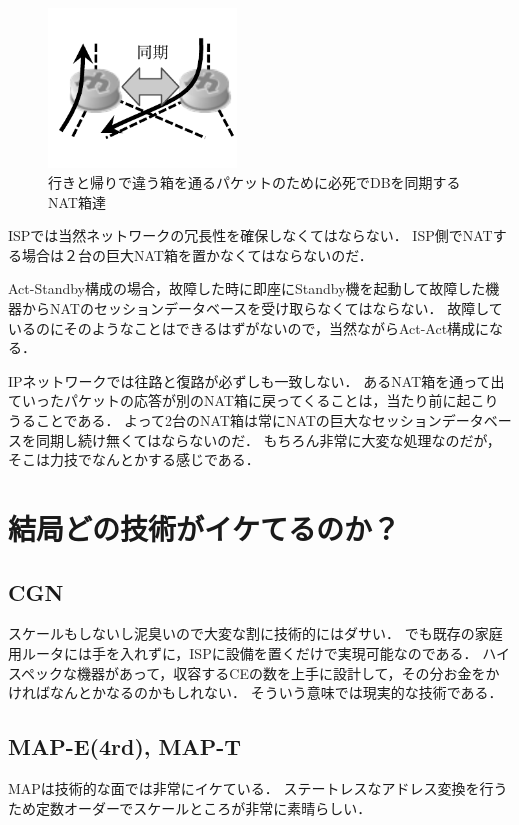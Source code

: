 \begin{figure}
\centering
\includegraphics[bb=0 10 140 109,width=5cm]{./yuyarin/cgn-nat.pdf}
\caption{行きと帰りで違う箱を通るパケットのために必死でDBを同期するNAT箱達}
\end{figure}

ISPでは当然ネットワークの冗長性を確保しなくてはならない．
ISP側でNATする場合は２台の巨大NAT箱を置かなくてはならないのだ．

Act-Standby構成の場合，故障した時に即座にStandby機を起動して故障した機器からNATのセッションデータベースを受け取らなくてはならない．
故障しているのにそのようなことはできるはずがないので，当然ながらAct-Act構成になる．

IPネットワークでは往路と復路が必ずしも一致しない．
あるNAT箱を通って出ていったパケットの応答が別のNAT箱に戻ってくることは，当たり前に起こりうることである．
よって2台のNAT箱は常にNATの巨大なセッションデータベースを同期し続け無くてはならないのだ．
もちろん非常に大変な処理なのだが，そこは力技でなんとかする感じである．

\section{結局どの技術がイケてるのか？}

\subsection{CGN}
スケールもしないし泥臭いので大変な割に技術的にはダサい．
でも既存の家庭用ルータには手を入れずに，ISPに設備を置くだけで実現可能なのである．
ハイスペックな機器があって，収容するCEの数を上手に設計して，その分お金をかければなんとかなるのかもしれない．
そういう意味では現実的な技術である．

\subsection{MAP-E(4rd), MAP-T}
MAPは技術的な面では非常にイケている．
ステートレスなアドレス変換を行うため定数オーダーでスケールところが非常に素晴らしい．

